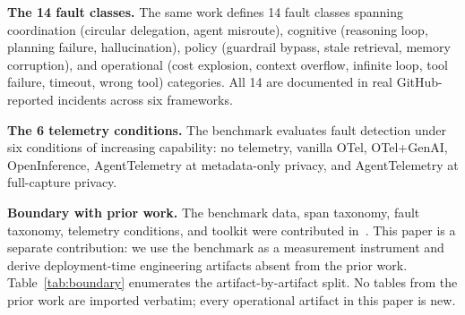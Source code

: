 \documentclass[conference]{IEEEtran}
\begin{document}
\textbf{The 14 fault classes.}
The same work defines 14 fault classes spanning coordination
(circular delegation, agent misroute), cognitive (reasoning loop,
planning failure, hallucination), policy (guardrail bypass,
stale retrieval, memory corruption), and operational
(cost explosion, context overflow, infinite loop, tool failure,
timeout, wrong tool) categories. All 14 are documented in real
GitHub-reported incidents across six frameworks.

\textbf{The 6 telemetry conditions.}
The benchmark evaluates fault detection under six conditions of
increasing capability: no telemetry, vanilla OTel, OTel+GenAI,
OpenInference, AgentTelemetry at metadata-only privacy, and
AgentTelemetry at full-capture privacy.

\textbf{Boundary with prior work.}
The benchmark data, span taxonomy, fault taxonomy, telemetry
conditions, and toolkit were contributed
in~\cite{agenttelemetry_aiware}. This paper is a separate
contribution: we use the benchmark as a measurement instrument and
derive deployment-time engineering artifacts absent from the prior
work. Table~\ref{tab:boundary} enumerates the artifact-by-artifact
split. No tables from the prior work are imported verbatim; every
operational artifact in this paper is new.
\end{document}
